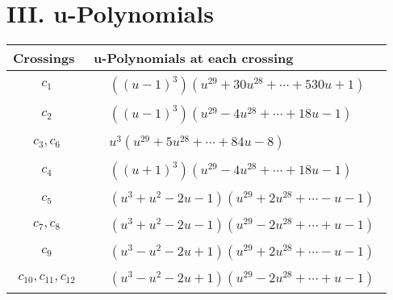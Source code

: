 \documentclass[1p]{elsarticle_modified}
\theoremstyle{definition}
\begin{document}
\newpage\renewcommand{\arraystretch}{1}
\centering \section*{ III. u-Polynomials}
\begin{tabular}{m{50pt}|m{274pt}}
Crossings & \hspace{64pt}u-Polynomials at each crossing \\
\hline $$\begin{aligned}c_{1}\end{aligned}$$&$\begin{aligned}
&((u-1)^3)(u^{29}+30 u^{28}+\cdots+530 u+1)
\end{aligned}$\\
\hline $$\begin{aligned}c_{2}\end{aligned}$$&$\begin{aligned}
&((u-1)^3)(u^{29}-4 u^{28}+\cdots+18 u-1)
\end{aligned}$\\
\hline $$\begin{aligned}c_{3},c_{6}\end{aligned}$$&$\begin{aligned}
&u^3(u^{29}+5 u^{28}+\cdots+84 u-8)
\end{aligned}$\\
\hline $$\begin{aligned}c_{4}\end{aligned}$$&$\begin{aligned}
&((u+1)^3)(u^{29}-4 u^{28}+\cdots+18 u-1)
\end{aligned}$\\
\hline $$\begin{aligned}c_{5}\end{aligned}$$&$\begin{aligned}
&(u^3+u^2-2 u-1)(u^{29}+2 u^{28}+\cdots- u-1)
\end{aligned}$\\
\hline $$\begin{aligned}c_{7},c_{8}\end{aligned}$$&$\begin{aligned}
&(u^3+u^2-2 u-1)(u^{29}-2 u^{28}+\cdots+u-1)
\end{aligned}$\\
\hline $$\begin{aligned}c_{9}\end{aligned}$$&$\begin{aligned}
&(u^3- u^2-2 u+1)(u^{29}+2 u^{28}+\cdots- u-1)
\end{aligned}$\\
\hline $$\begin{aligned}c_{10},c_{11},c_{12}\end{aligned}$$&$\begin{aligned}
&(u^3- u^2-2 u+1)(u^{29}-2 u^{28}+\cdots+u-1)
\end{aligned}$\\
\hline
\end{tabular}\newpage\renewcommand{\arraystretch}{1}
\end{document}
